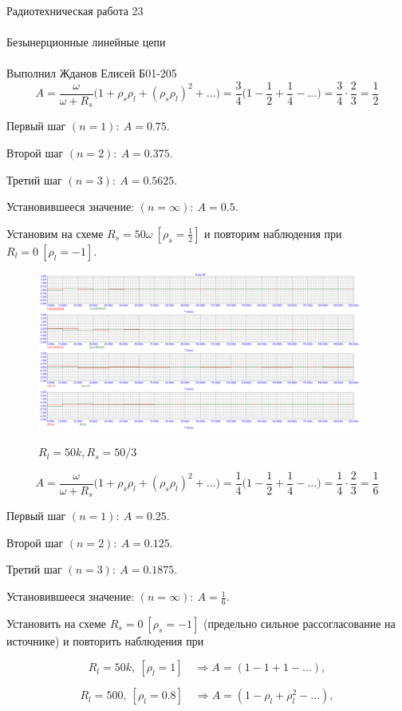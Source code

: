 \documentclass{astroedu-lab}
\begin{document}
\begin{problem}{\huge Радиотехническая работа 23\\\\Безынерционные линейные цепи\\\\Выполнил Жданов Елисей Б01-205}
\[A = \frac{\omega}{\omega + R_s} \Big( 1 + \rho_s \rho_l + (\rho_s \rho_l)^2 + ...\Big) = \frac{3}{4} \Big( 1 - \frac{1}{2} + \frac{1}{4} - ... \Big) = \frac{3}{4} \cdot \frac{2}{3} = \frac{1}{2}\]

Первый шаг $(n = 1): \: A = 0.75$.

Второй шаг $(n = 2): \: A = 0.375$.

Третий шаг $(n = 3): \: A = 0.5625$.

Установившееся значение: $(n = \infty): \: A = 0.5$.

\newpage

Установим на схеме $R_s = 50\omega \: [\rho_s = \frac{1}{2}]$ и повторим наблюдения при $R_l = 0 \:[\rho_l = -1]$.

\begin{figure}[h!]
\centering
\includegraphics[width=0.95\textwidth]{картинки/Graph10.png}
\label{fig:Image1}
\caption{$R_l = 50k, R_s = 50/3$}
\end{figure}

\[A = \frac{\omega}{\omega + R_s} \Big( 1 + \rho_s \rho_l + (\rho_s \rho_l)^2 + ...\Big) = \frac{1}{4} \Big( 1 - \frac{1}{2} + \frac{1}{4} - ... \Big) = \frac{1}{4} \cdot \frac{2}{3} = \frac{1}{6}\]

Первый шаг $(n = 1): \: A = 0.25$.

Второй шаг $(n = 2): \: A = 0.125$.

Третий шаг $(n = 3): \: A = 0.1875$.

Установившееся значение: $(n = \infty): \: A = \frac{1}{6}$.

\newpage

Установить на схеме $R_s = 0 \: [\rho_s = -1]$ (предельно сильное рассогласование на источнике) и повторить наблюдения при

\[R_l = 50k, \: [\rho_l = 1] \quad \Rightarrow A = (1 -1 +1 -...),\]

\[R_l = 500, \: [\rho_l = 0.8] \quad \Rightarrow A = (1 - \rho_l + \rho_l^2 -...),\]


\end{problem}
\end{document}
